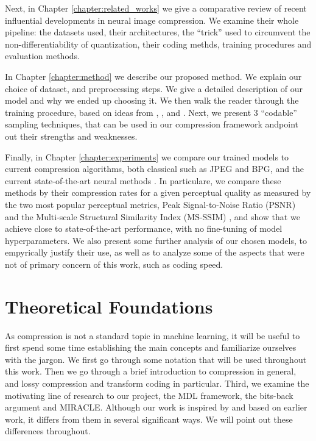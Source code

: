 \par
Next, in Chapter \ref{chapter:related_works} we give a comparative review of recent
influential developments in neural image compression. We examine their whole
pipeline: the datasets used, their architectures, the ``trick'' used to
circumvent the non-differentiability of quantization, their coding methds,
training procedures and evaluation methods.

\par
In Chapter \ref{chapter:method} we describe our proposed method. We explain our
choice of dataset, and preprocessing steps. We give a detailed description of
our model and why we ended up choosing it. We then walk the reader through the
training procedure, based on ideas from \cite{sonderby2016train},
\cite{higgins2017beta}, \cite{balle2018variational} and \cite{dai2019diagnosing}.
Next, we present 3 ``codable'' sampling techniques, that can be used in our
compression framework andpoint out their strengths and weaknesses.

\par
Finally, in Chapter \ref{chapter:experiments} we compare our trained models to
current compression algorithms, both classical such as JPEG and BPG, and
the current state-of-the-art neural methods \cite{balle2018variational}. In
particulare, we compare these methods by their compression rates for a given
perceptual quality as measured by the two most popular perceptual metrics, Peak
Signal-to-Noise Ratio (PSNR) \cite{psnr} and the Multi-scale Structural
Similarity Index (MS-SSIM) \cite{msssim}, and show that we achieve close to
state-of-the-art performance, with no fine-tuning of model hyperparameters.
We also present some further analysis of our chosen models, to empyrically
justify their use, as well as to analyze some of the aspects that were not of
primary concern of this work, such as coding speed.
\paragraph{}

\section{Theoretical Foundations}
\label{sec:theoretical_foundations}
\par
As compression is not a standard topic in machine learning, it will be useful to
first spend some time establishing the main concepts and familiarize ourselves
with the jargon. We first go through some notation that will be used throughout
this work. Then we go through a brief introduction to compression in general,
and lossy compression and transform coding in particular. Third, we examine the
motivating line of research to our project, the MDL framework, the bits-back
argument and MIRACLE. Although our work is inspired by and based on earlier
work, it differs from them in several significant ways. We will point out these
differences throughout.
